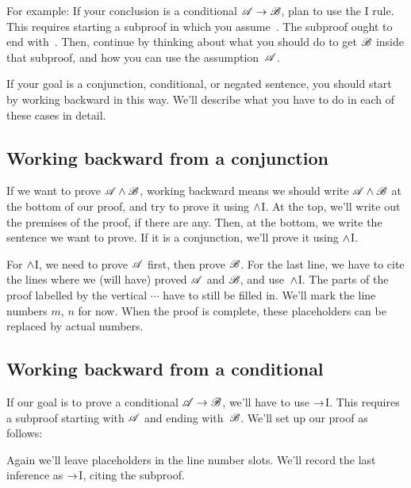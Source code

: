 For example: If your conclusion is a conditional $\mathscr{A}\rightarrow\mathscr{B}$, plan to use the {\eif}I rule. This requires starting a subproof in which you assume~. The subproof ought to end with~. Then, continue by thinking about what you should do to get $\mathscr{B}$ inside that subproof, and how you can use the assumption~$\mathscr{A}$.

If your goal is a conjunction, conditional, or negated sentence, you should start by working backward in this way. We'll describe what you have to do in each of these cases in detail.

\subsection*{Working backward from a conjunction}

If we want to prove $\mathscr{A} \wedge \mathscr{B}$, working backward means we should write $\mathscr{A} \wedge \mathscr{B}$ at the bottom of our proof, and try to prove it using $\wedge$I. At the top, we'll write out the premises of the proof, if there are any. Then, at the bottom, we write the sentence we want to prove. If it is a conjunction, we'll prove it using $\wedge$I.
  \begin{fitchproof}
	\PR
	\ellipsesline 
	\PR
\ellipsesline
    \ellipsesline 
  \end{fitchproof}
For $\wedge$I, we need to prove $\mathscr{A}$ first, then prove
$\mathscr{B}$. For the last line, we have to cite the lines where we
(will have) proved $\mathscr{A}$ and  $\mathscr{B}$, and use~$\wedge$I. The
parts of the proof labelled by the vertical $\cdots$ have to still be filled in.
We'll mark the line numbers $m$, $n$ for now. When the proof is
complete, these placeholders can be replaced by actual numbers.

\subsection*{Working backward from a conditional}

If our goal is to prove a conditional $\mathscr{A} \rightarrow \mathscr{B}$, we'll have to use $\rightarrow$I. This requires a subproof starting with $\mathscr{A}$ and ending with~$\mathscr{B}$. We'll set up our proof as follows:
\begin{fitchproof}
\open
{}
\ellipsesline 
{}
\close
{}
\end{fitchproof} 
Again we'll leave placeholders in the line number slots. We'll record the last inference as $\rightarrow$I, citing the subproof.

